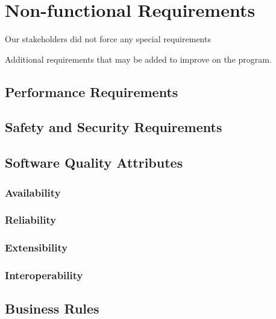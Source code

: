 \section{Non-functional Requirements}
Our stakeholders did not force any special requirements

Additional requirements that may be added to improve on the program.
\subsection{Performance Requirements}
\subsection{Safety and Security Requirements}
\subsection{Software Quality Attributes}
\subsubsection{Availability}
\subsubsection{Reliability}
\subsubsection{Extensibility}
\subsubsection{Interoperability}
\subsection{Business Rules}
